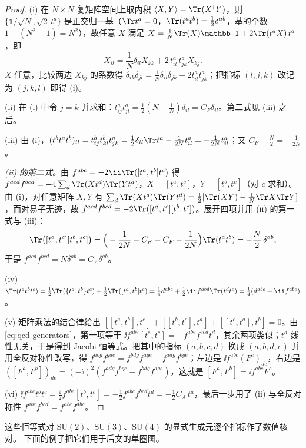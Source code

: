 \begin{proof}
(i) 在 $N\times N$ 复矩阵空间上取内积 $\langle X,Y\rangle=\Tr(X^\dagger Y)$，则 $\{\mathbb 1/\sqrt N,\sqrt2\,t^a\}$ 是正交归一基（$\Tr t^a=0$，$\Tr(t^at^b)=\frac12\delta^{ab}$，基的个数 $1+(N^2-1)=N^2$），故任意 $X$ 满足 $X=\frac1N\Tr(X)\mathbb 1+2\Tr(t^aX)\,t^a$，即
\[
X_{il}=\frac1N\delta_{il}X_{kk}+2\,t^a_{il}\,t^a_{jk}X_{kj}.
\]
$X$ 任意，比较两边 $X_{kj}$ 的系数得 $\delta_{ik}\delta_{jl}=\frac1N\delta_{il}\delta_{jk}+2t^a_{il}t^a_{jk}$；把指标 $(l,j,k)$ 改记为 $(j,k,l)$ 即得 (i)。

(ii) 在 (i) 中令 $j=k$ 并求和：$t^a_{ij}t^a_{jl}=\frac12(N-\frac1N)\delta_{il}=C_F\delta_{il}$。第二式见 (iii) 之后。

(iii) 由 (i)，$(t^bt^at^b)_{il}=t^b_{ij}t^b_{kl}t^a_{jk}=\frac12\delta_{il}\Tr t^a-\frac1{2N}t^a_{il}=-\frac1{2N}t^a_{il}$；又 $C_F-\frac N2=-\frac1{2N}$。

\emph{(ii) 的第二式。}由 $f^{abc}=-2\ii\Tr([t^a,t^b]t^c)$ 得 $f^{acd}f^{bcd}=-4\sum_d\Tr(Xt^d)\Tr(Yt^d)$，$X=[t^a,t^c]$，$Y=[t^b,t^c]$（对 $c$ 求和）。由 (i)，对任意矩阵 $X,Y$ 有 $\sum_d\Tr(Xt^d)\Tr(Yt^d)=\frac12[\Tr(XY)-\frac1N\Tr X\Tr Y]$，而对易子无迹，故 $f^{acd}f^{bcd}=-2\Tr([t^a,t^c][t^b,t^c])$。展开四项并用 (ii) 的第一式与 (iii)：
\[
\Tr\big([t^a,t^c][t^b,t^c]\big)=\Big(-\frac1{2N}-C_F-C_F-\frac1{2N}\Big)\Tr(t^at^b)=-\frac N2\,\delta^{ab},
\]
于是 $f^{acd}f^{bcd}=N\delta^{ab}=C_A\delta^{ab}$。

(iv) $\Tr(t^at^bt^c)=\frac12\Tr(\{t^a,t^b\}t^c)+\frac12\Tr([t^a,t^b]t^c)=\frac14d^{abc}+\frac12\ii f^{abd}\Tr(t^dt^c)=\frac14(d^{abc}+\ii f^{abc})$。

(v) 矩阵乘法的结合律给出 $[[t^a,t^b],t^c]+[[t^b,t^c],t^a]+[[t^c,t^a],t^b]=0$。由\cref{eq:qcd-generators}，第一项等于 $\ii f^{abe}[t^e,t^c]=-f^{abe}f^{ecd}t^d$，其余两项类似；$t^d$ 线性无关，于是得到 Jacobi 恒等式。把其中的指标 $(a,b,c,d)$ 换成 $(a,b,d,e)$ 并用全反对称性改写，得 $f^{abg}f^{gde}=f^{bdg}f^{age}-f^{adg}f^{bge}$；左边是 $\ii f^{abc}(F^c)_{de}$，右边是 $([F^a,F^b])_{de}=(-\ii)^2(f^{adg}f^{bge}-f^{bdg}f^{age})$，这就是 $[F^a,F^b]=\ii f^{abc}F^c$。

(vi) $\ii f^{abc}t^bt^c=\frac{\ii}2f^{abc}[t^b,t^c]=-\frac12f^{abc}f^{bcd}t^d=-\frac12C_A\,t^a$，最后一步用了 (ii) 与全反对称性 $f^{abc}f^{bcd}=f^{abc}f^{dbc}$。
\end{proof}

这些恒等式对 $\mathrm{SU}(2)$、$\mathrm{SU}(3)$、$\mathrm{SU}(4)$ 的显式生成元逐个指标作了数值核对。%
下面的例子把它们用于后文的单圈图。

